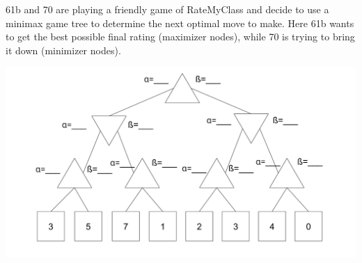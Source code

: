 \question 61b and 70 are playing a friendly game of RateMyClass and decide to use a  minimax game tree to determine the next optimal move to make. Here 61b wants to get the best possible final rating (maximizer nodes), while 70 is trying to bring it down (minimizer nodes).

\begin{center}
    \includegraphics[width=.9\textwidth,height=.9\textheight,keepaspectratio]{topics/trees/game-trees/empty-minimax.png} \newline
\end{center}

